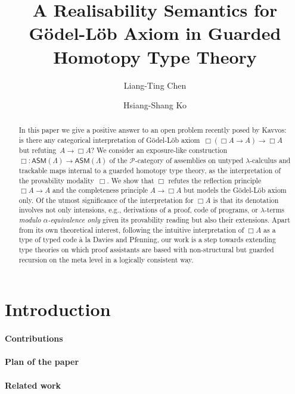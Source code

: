 \documentclass[a4paper,UKenglish,numberwithinsect,cleveref,thm-restate]{lipics-v2021}
\title{A Realisability Semantics for Gödel-Löb Axiom in Guarded Homotopy Type Theory}
\author{Liang-Ting Chen}%
  {Institute of Information Science, Academia Sinica, Taiwan~\url{https://l-tchen.github.io}}%
  {liang.ting.chen.tw@gmail.com}%
  {https://orcid.org/0000-0002-3250-1331}{}
\author{Hsiang-Shang Ko}%
  {Institute of Information Science, Academia Sinica, Taiwan~\url{https://josh-hs-ko.github.io}}%
  {joshko@iis.sinica.edu.tw}%
  {https://orcid.org/0000-0002-2439-1048}{}
\newcommand{\PP}{\mathscr{P}}
\newcommand{\ASM}{\mathsf{ASM}}
\theoremstyle{plain}
\begin{document}
\maketitle

\begin{abstract}
  In this paper we give a positive answer to an open problem recently posed by Kavvos: is there any categorical interpretation of Gödel-Löb axiom~$\Box (\Box A \to A) \to \Box A$ but refuting~$A \to \Box A$?
  We consider an exposure-like construction $\Box\colon \ASM(\Lambda) \to \ASM(\Lambda)$ of the $\PP$-category of assemblies on untyped $\lambda$-calculus and trackable maps internal to a guarded homotopy type theory, as the interpretation of the provability modality~$\Box$.
  We show that $\Box$ refutes the reflection principle $\Box A \to A$ and the completeness principle $A \to \Box A$ but models the Gödel-Löb axiom only.
  Of the utmost significance of the interpretation for $\Box A$ is that its denotation involves not only intensions, e.g., derivations of a proof, code of programs, or $\lambda$-terms \emph{modulo $\alpha$-equivalence only} given its provability reading but also their extensions. 
  Apart from its own theoretical interest, following the intuitive interpretation of $\Box A$ as a type of typed code \`a la Davies and Pfenning, our work is a step towards extending type theories on which proof assistants are based with non-structural but guarded recursion on the meta level in a logically consistent way.
\end{abstract}

\section{Introduction}\label{sec:intro}
\cite{Litak2014}

\paragraph*{Contributions}

\paragraph*{Plan of the paper}

\paragraph*{Related work}
\cite{Visser2019,Beklemishev2006}
\cite{Kavvos2017,Kavvos2020}
\cite{Shamkanov2014,Shamkanov2016a}
\end{document}
